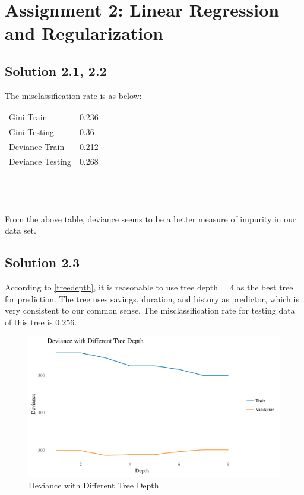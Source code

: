 \documentclass[11pt,english]{article}
\begin{document}
\section*{Assignment 2: Linear Regression and Regularization}


\subsection*{Solution 2.1, 2.2}
The misclassification rate is as below:\\

\begin{tabular}{ l l }
  Gini Train & 0.236 \\
  Gini Testing & 0.36 \\
  Deviance Train & 0.212 \\
  Deviance Testing & 0.268
\end{tabular}
\\\\\\
From the above table, deviance seems to be a better measure of impurity in our
data set.

\subsection*{Solution 2.3}
According to \autoref{treedepth}, it is reasonable to use tree depth = 4
as the best tree for prediction. The tree uses savings, duration, and
history as predictor, which is very consistent to our common sense.
The misclassification rate for testing data of this tree is $0.256$.

\begin{figure}[H]
  \centering
  \includegraphics[width = 1.13\textwidth]{treedepth.pdf}
  \caption{Deviance with Different Tree Depth}
  \label{treedepth}
\end{figure}
\end{document}
